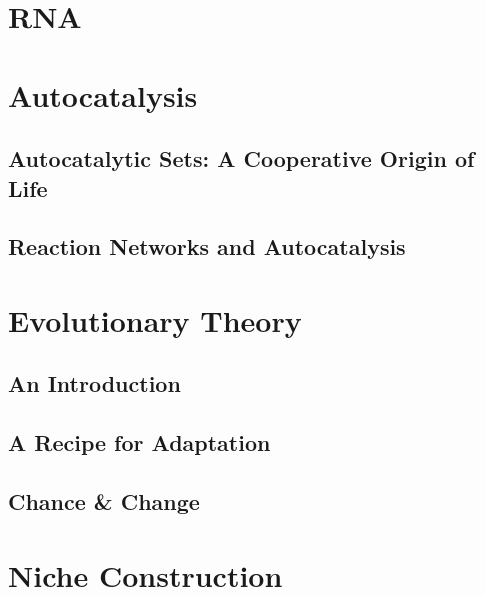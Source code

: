 \documentclass[]{article}
\begin{document}
\section{RNA}

\section{Autocatalysis}

\subsection{Autocatalytic Sets: A Cooperative Origin of Life}

\subsection{Reaction Networks and Autocatalysis}

\section{Evolutionary Theory}

\subsection{An Introduction}

\subsection{A Recipe for Adaptation}

\subsection{Chance \& Change}

\section{Niche Construction}


\printglossaries

 


\end{document}
